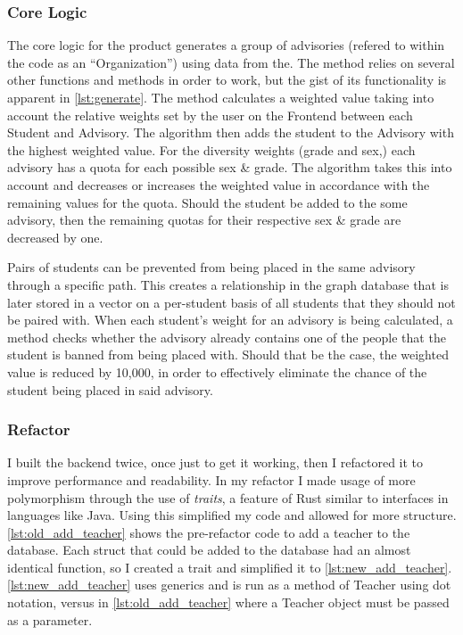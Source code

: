 \documentclass{paper}
\begin{document}
\subsubsection{Core Logic}
The core logic for the product generates a group of advisories (refered to within the code as an \enquote{Organization}) using data from the.
The method relies on several other functions and methods in order to work, but the gist of its functionality is apparent in \cref{lst:generate}.
The method calculates a weighted value taking into account the relative weights set by the user on the Frontend between each Student and Advisory.
The algorithm then adds the student to the Advisory with the highest weighted value.
For the diversity weights (grade and sex,) each advisory has a quota for each possible sex \& grade.
The algorithm takes this into account and decreases or increases the weighted value in accordance with the remaining values for the quota.
Should the student be added to the some advisory, then the remaining quotas for their respective sex \& grade are decreased by one.

Pairs of students can be prevented from being placed in the same advisory through a specific path.
This creates a relationship in the graph database that is later stored in a vector on a per-student basis of all students that they should not be paired with.
When each student's weight for an advisory is being calculated, a method checks whether the advisory already contains one of the people that the student is banned from being placed with.
Should that be the case, the weighted value is reduced by 10,000, in order to effectively eliminate the chance of the student being placed in said advisory.



\subsubsection{Refactor}
I built the backend twice, once just to get it working, then I refactored it to improve performance and readability.
In my refactor I made usage of more polymorphism through the use of \emph{traits}, a feature of Rust similar to interfaces in languages like Java.
Using this simplified my code and allowed for more structure.
\cref{lst:old_add_teacher} shows the pre-refactor code to add a teacher to the database.
Each struct that could be added to the database had an almost identical function, so I created a trait and simplified it to \cref{lst:new_add_teacher}.
\cref{lst:new_add_teacher} uses generics and is run as a method of Teacher using dot notation, versus in \cref{lst:old_add_teacher} where a Teacher object must be passed as a parameter.
\end{document}
